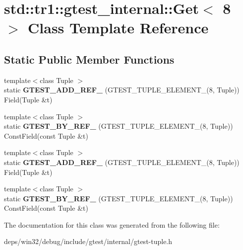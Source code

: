 \hypertarget{classstd_1_1tr1_1_1gtest__internal_1_1_get_3_018_01_4}{}\section{std\+:\+:tr1\+:\+:gtest\+\_\+internal\+:\+:Get$<$ 8 $>$ Class Template Reference}
\label{classstd_1_1tr1_1_1gtest__internal_1_1_get_3_018_01_4}
\subsection*{Static Public Member Functions}
\begin{DoxyCompactItemize}
\item 
\hypertarget{classstd_1_1tr1_1_1gtest__internal_1_1_get_3_018_01_4_adf667300b7efed278f4ee3bf4d2edb85}{}{\footnotesize template$<$class Tuple $>$ }\\static {\bfseries G\+T\+E\+S\+T\+\_\+\+A\+D\+D\+\_\+\+R\+E\+F\+\_\+} (G\+T\+E\+S\+T\+\_\+\+T\+U\+P\+L\+E\+\_\+\+E\+L\+E\+M\+E\+N\+T\+\_\+(8, Tuple)) Field(Tuple \&t)\label{classstd_1_1tr1_1_1gtest__internal_1_1_get_3_018_01_4_adf667300b7efed278f4ee3bf4d2edb85}

\item 
\hypertarget{classstd_1_1tr1_1_1gtest__internal_1_1_get_3_018_01_4_ab9645513ad2f983157f4062c89e910e7}{}{\footnotesize template$<$class Tuple $>$ }\\static {\bfseries G\+T\+E\+S\+T\+\_\+\+B\+Y\+\_\+\+R\+E\+F\+\_\+} (G\+T\+E\+S\+T\+\_\+\+T\+U\+P\+L\+E\+\_\+\+E\+L\+E\+M\+E\+N\+T\+\_\+(8, Tuple)) Const\+Field(const Tuple \&t)\label{classstd_1_1tr1_1_1gtest__internal_1_1_get_3_018_01_4_ab9645513ad2f983157f4062c89e910e7}

\item 
\hypertarget{classstd_1_1tr1_1_1gtest__internal_1_1_get_3_018_01_4_adf667300b7efed278f4ee3bf4d2edb85}{}{\footnotesize template$<$class Tuple $>$ }\\static {\bfseries G\+T\+E\+S\+T\+\_\+\+A\+D\+D\+\_\+\+R\+E\+F\+\_\+} (G\+T\+E\+S\+T\+\_\+\+T\+U\+P\+L\+E\+\_\+\+E\+L\+E\+M\+E\+N\+T\+\_\+(8, Tuple)) Field(Tuple \&t)\label{classstd_1_1tr1_1_1gtest__internal_1_1_get_3_018_01_4_adf667300b7efed278f4ee3bf4d2edb85}

\item 
\hypertarget{classstd_1_1tr1_1_1gtest__internal_1_1_get_3_018_01_4_ab9645513ad2f983157f4062c89e910e7}{}{\footnotesize template$<$class Tuple $>$ }\\static {\bfseries G\+T\+E\+S\+T\+\_\+\+B\+Y\+\_\+\+R\+E\+F\+\_\+} (G\+T\+E\+S\+T\+\_\+\+T\+U\+P\+L\+E\+\_\+\+E\+L\+E\+M\+E\+N\+T\+\_\+(8, Tuple)) Const\+Field(const Tuple \&t)\label{classstd_1_1tr1_1_1gtest__internal_1_1_get_3_018_01_4_ab9645513ad2f983157f4062c89e910e7}

\end{DoxyCompactItemize}


The documentation for this class was generated from the following file\+:\begin{DoxyCompactItemize}
\item 
deps/win32/debug/include/gtest/internal/gtest-\/tuple.\+h\end{DoxyCompactItemize}
